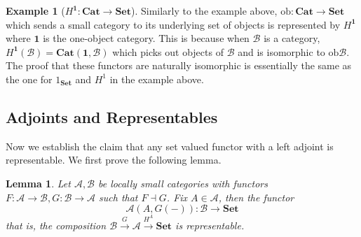 \documentclass[11pt]{article}
\theoremstyle{definition}
\theoremstyle{definition}
\newtheorem{ex}{Example}
\theoremstyle{plain}
\theoremstyle{plain}
\theoremstyle{plain}
\newtheorem{lem}{Lemma}
\begin{document}
\begin{ex}[$H^{\textbf{1}}:\textbf{Cat} \to \textbf{Set}$]
Similarly to the example above, $\text{ob}:\textbf{Cat} \to \textbf{Set}$ which sends a small category to its underlying set of objects is represented by $H^{\textbf{1}}$ where $\textbf{1}$ is the one-object category. This is because when $\mathscr{B}$ is a category, $H^{\textbf{1}}(\mathscr{B}) = \textbf{Cat}(\textbf{1}, \mathscr{B})$ which picks out objects of $\mathscr{B}$ and is isomorphic to $\text{ob}\mathscr{B}$. The proof that these functors are naturally isomorphic is essentially the same as the one for $1_{\textbf{Set}}$ and $H^{1}$ in the example above.
\end{ex}

\subsection*{Adjoints and Representables}

Now we establish the claim that any set valued functor with a left adjoint is representable. We first prove the following lemma.

\begin{lem}
Let $\mathscr{A}, \mathscr{B}$ be locally small categories with functors $F:\mathscr{A} \to \mathscr{B}, G:\mathscr{B} \to \mathscr{A}$ such that $F \dashv G$. Fix $A \in \mathscr{A}$, then the functor \begin{equation*} \mathscr{A}(A, G(-)): \mathscr{B} \to \textbf{Set} \end{equation*} that is, the composition $\mathscr{B} \overset{G}{\to} \mathscr{A} \overset{H^{A}}{\to} \textbf{Set}$ is representable.
\end{lem}
\end{document}
